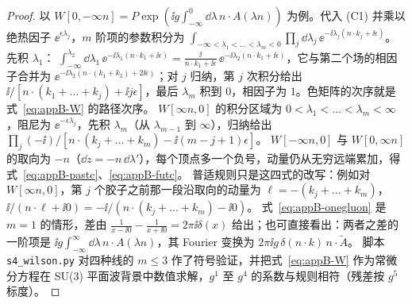 \begin{proof}
以 $W[0,-\infty n]=P\exp(\ii g\int_{-\infty}^0\dd\lambda\,n\cdot A(\lambda n))$ 为例。代入 (C1) 并乘以绝热因子 $\ee^{\epsilon\lambda_j}$，$m$ 阶项的参数积分为
$\int_{-\infty<\lambda_1<\dots<\lambda_m<0}\prod_j\dd\lambda_j\,\ee^{-\ii\lambda_j(n\cdot k_j+\ii\epsilon)}$。先积 $\lambda_1$：
$\int_{-\infty}^{\lambda_2}\dd\lambda_1\,\ee^{-\ii\lambda_1(n\cdot k_1+\ii\epsilon)}=\frac{\ii}{n\cdot k_1+\ii\epsilon}\,\ee^{-\ii\lambda_2(n\cdot k_1+\ii\epsilon)}$，它与第二个场的相因子合并为
$\ee^{-\ii\lambda_2(n\cdot(k_1+k_2)+2\ii\epsilon)}$；对 $j$ 归纳，第 $j$ 次积分给出 $\ii/[n\cdot(k_1+\dots+k_j)+\ii j\epsilon]$，最后 $\lambda_m$ 积到 $0$，相因子为 $1$。色矩阵的次序就是式~\eqref{eq:appB-W} 的路径次序。
$W[\infty n,0]$ 的积分区域为 $0<\lambda_1<\dots<\lambda_m<\infty$，阻尼为 $\ee^{-\epsilon\lambda_j}$，先积 $\lambda_m$（从 $\lambda_{m-1}$ 到 $\infty$），归纳给出 $\prod_j(-\ii)/[n\cdot(k_j+\dots+k_m)-\ii(m-j+1)\epsilon]$。
$W[-\infty n,0]$ 与 $W[0,\infty n]$ 的取向为 $-n$（$\dd z=-n\,\dd\lambda'$），每个顶点多一个负号，动量仍从无穷远端累加，得式~\eqref{eq:appB-pastc}、\eqref{eq:appB-futc}。
普适规则只是这四式的改写：例如对 $W[\infty n,0]$，第 $j$ 个胶子之前那一段沿取向的动量为 $\ell=-(k_j+\dots+k_m)$，$\ii/(n\cdot\ell+\ii0)=-\ii/(n\cdot(k_j+\dots+k_m)-\ii0)$。
式~\eqref{eq:appB-onegluon} 是 $m=1$ 的情形，差由 $\frac1{x-\ii0}-\frac1{x+\ii0}=2\pi\ii\delta(x)$ 给出；也可直接看出：两者之差的一阶项是 $\ii g\int_{-\infty}^{\infty}\dd\lambda\,n\cdot A(\lambda n)$，其 Fourier 变换为 $2\pi\ii g\,\delta(n\cdot k)\,n\cdot\tilde A$。
脚本 \texttt{s4\_wilson.py} 对四种线的 $m\le3$ 作了符号验证，并把式~\eqref{eq:appB-W} 作为常微分方程在 SU(3) 平面波背景中数值求解，$g^1$ 至 $g^4$ 的系数与规则相符（残差按 $g^5$ 标度）。
\end{proof}
